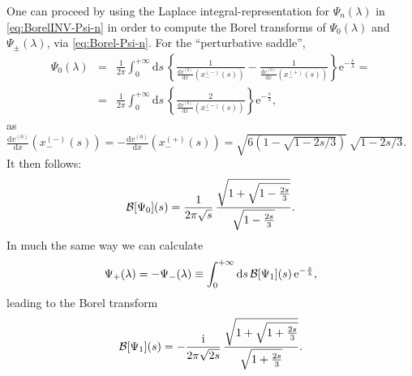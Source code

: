 \documentclass[11pt,a4paper]{article}
\newcommand{\CB}{{\cal B}}
\newcommand{\be}{\begin{equation}}
\newcommand{\ee}{\end{equation}}
\newcommand{\bea}{\begin{eqnarray}}
\newcommand{\eea}{\end{eqnarray}}
\newcommand{\rme}{{\mathrm{e}}}
\newcommand{\rmi}{{\mathrm{i}}}
\newcommand{\rmd}{{\mathrm{d}}}
\begin{document}
One can proceed by using the Laplace integral-representation for $\Psi_n (\lambda)$ in \eqref{eq:BorelINV-Psi-n} in order to compute the Borel transforms of $\Psi_{0} (\lambda)$ and $\Psi_{\pm} (\lambda)$, via \eqref{eq:Borel-Psi-n}. For the ``perturbative saddle'',
%
\bea
\Psi_0 (\lambda) &=& \frac{1}{2\pi} \int_{0}^{+\infty} \rmd s\, \left\{ \frac{1}{\frac{\rmd v^{(0)}}{\rmd x} \left( x_-^{(-)} (s) \right)} - \frac{1}{\frac{\rmd v^{(0)}}{\rmd x} \left( x_-^{(+)} (s) \right)} \right\} \rme^{-\frac{s}{\lambda}} = \nonumber \\
&=& \frac{1}{2\pi} \int_{0}^{+\infty} \rmd s\, \left\{ \frac{2}{\frac{\rmd v^{(0)}}{\rmd x} \left( x_-^{(-)} (s) \right)} \right\} \rme^{-\frac{s}{\lambda}},
\label{Psi0lambdadefined}
\eea
%
\noindent
as $\frac{\rmd v^{(0)}}{\rmd x} \left( x_-^{(-)} (s) \right) = - \frac{\rmd v^{(0)}}{\rmd x} \left( x_-^{(+)} (s) \right) = \sqrt{6 ( 1 - \sqrt{1-2s/3} )}\, \sqrt{1-2s/3}$. It then follows:
%
\be
\label{eq:Borel-Z0-after-change-var}
\CB [\Psi_0] (s) = \frac{1}{2\pi \sqrt{s}}\, \frac{\sqrt{1+\sqrt{1-\frac{2s}{3}}}}{\sqrt{1-\frac{2s}{3}}}.
\ee
%
\noindent
In much the same way we can calculate
%
\begin{equation}
\label{borel1/2factor}
\Psi_+ (\lambda) = - \Psi_- (\lambda) \equiv \int_{0}^{+\infty} \rmd s\, \CB [\Psi_1] (s)\, \rme^{-\frac{s}{\lambda}},
\end{equation}
%
\noindent
leading to the Borel transform
%
\begin{equation}
\label{eq:Borel-Z1-after-change-var}
\CB [\Psi_1] (s) = - \frac{\rmi}{2\pi \sqrt{2s}}\, \frac{\sqrt{1+\sqrt{1+\frac{2s}{3}}}}{\sqrt{1+\frac{2s}{3}}}.
\end{equation}
\end{document}

